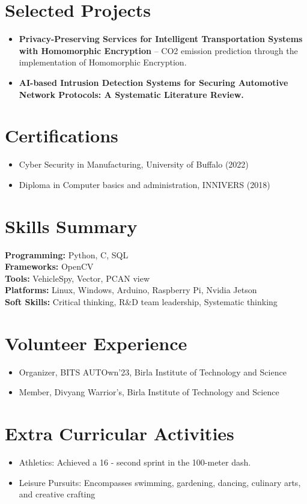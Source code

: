 \documentclass[a4paper,11pt]{article}
\begin{document}
\section*{Selected Projects}
\begin{itemize}
    \item \textbf {Privacy-Preserving Services for Intelligent Transportation Systems with Homomorphic Encryption} -- CO2 emission prediction through the implementation of Homomorphic Encryption.
    \item \textbf {AI-based Intrusion Detection Systems for Securing Automotive Network Protocols: A Systematic Literature Review.}
\end{itemize}


\section*{Certifications}
\begin{itemize}
    \item Cyber Security in Manufacturing, University of Buffalo (2022)
    \item Diploma in Computer basics and administration, INNIVERS (2018)
\end{itemize}


\section*{Skills Summary}
\textbf{Programming:} Python, C, SQL \\
\textbf{Frameworks:} OpenCV \\
\textbf{Tools:} VehicleSpy, Vector, PCAN view\\
\textbf{Platforms:} Linux, Windows, Arduino, Raspberry Pi, Nvidia Jetson \\
\textbf{Soft Skills:} Critical thinking, R\&D team leadership, Systematic thinking


\section*{Volunteer Experience}
\begin{itemize}
    \item Organizer, BITS AUTOwn’23, Birla Institute of Technology and Science
    \item Member, Divyang Warrior’s, Birla Institute of Technology and Science
\end{itemize}


\section*{Extra Curricular Activities}
\begin{itemize}
    \item Athletics: Achieved a 16 - second sprint in the 100-meter dash.
    \item Leisure Pursuits: Encompasses swimming, gardening, dancing, culinary arts, and creative crafting
\end{itemize}
\end{document}
